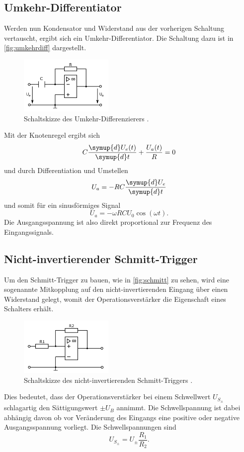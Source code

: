 \subsection{Umkehr-Differentiator}
Werden nun Kondensator und Widerstand aus der vorherigen Schaltung vertauscht, ergibt sich
ein Umkehr-Differentiator. Die Schaltung dazu ist in \autoref{fig:umkehrdiff}
dargestellt.
\begin{figure}[H]
    \centering
    \includegraphics[width=0.4\textwidth]{diff.png}
    \caption{Schaltskizze des Umkehr-Differenzierers \cite{anleitung}.}
    \label{fig:umkehrdiff}
\end{figure}
Mit der Knotenregel ergibt sich
\begin{equation*}
    C \frac{\symup{d} U_e(t)}{\symup{d} t} + \frac{U_a(t)}{R} = 0
\end{equation*}
und durch Differentiation und Umstellen
\begin{equation*}
    U_a = - R C \frac{\symup{d}U_e}{\symup{d} t}
\end{equation*}
und somit für ein sinusförmiges Signal
\begin{equation*}
    U_a = - \omega R C U_0 \cos(\omega t).
\end{equation*}
Die Ausgangsspannung ist also direkt proportional zur Frequenz des Eingangssignals.

\subsection{Nicht-invertierender Schmitt-Trigger}
Um den Schmitt-Trigger zu bauen, wie in \autoref{fig:schmitt} zu sehen, wird eine sogenannte
Mitkopplung auf den nicht-invertierenden Eingang über einen Widerstand gelegt, womit der
Operationsverstärker die Eigenschaft eines Schalters erhält.
\begin{figure}[H]
    \centering
    \includegraphics[width=0.4\textwidth]{schmitt.png}
    \caption{Schaltskizze des nicht-invertierenden Schmitt-Triggers \cite{anleitung}.}
    \label{fig:schmitt}
\end{figure}
Dies bedeutet, dass der Operationsverstärker
bei einem Schwellwert $U_{S_{\pm}}$ schlagartig den Sättigungswert $\pm U_B$ annimmt.
Die Schwellspannung ist dabei abhängig davon ob vor Veränderung des Eingangs eine
positive oder negative Ausgangsspannung vorliegt.
Die Schwellspannungen sind
\begin{equation*}
    U_{S_{\pm}} = U_{\pm} \frac{R_1}{R_2}.
\end{equation*}

